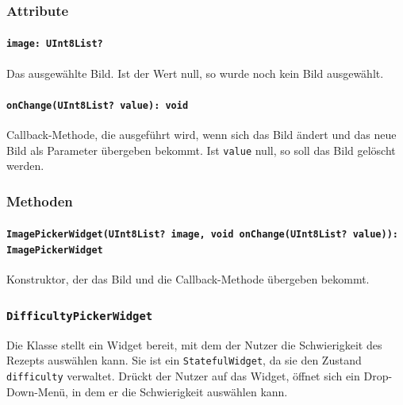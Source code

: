 \documentclass{entwurfsheft}
\begin{document}
\subsubsection*{Attribute}
\paragraph{\texttt{image: UInt8List?}}
Das ausgewählte Bild. Ist der Wert null, so wurde noch kein Bild ausgewählt.
\paragraph{\texttt{onChange(UInt8List? value): void}}
Callback-Methode, die ausgeführt wird, wenn sich das Bild ändert und das neue Bild als Parameter übergeben bekommt. Ist \texttt{value} null, so soll das Bild gelöscht werden.
\subsubsection*{Methoden}
\paragraph{\texttt{ImagePickerWidget(UInt8List? image, void onChange(UInt8List? value)): ImagePickerWidget}}
Konstruktor, der das Bild und die Callback-Methode übergeben bekommt.
\newpage

\subsubsection{\texttt{DifficultyPickerWidget}}
\label{sec:difficultyPickerWidget}
Die Klasse stellt ein Widget bereit, mit dem der Nutzer die Schwierigkeit des Rezepts auswählen kann. Sie ist ein \texttt{StatefulWidget}, da sie den Zustand \texttt{difficulty} verwaltet. Drückt der Nutzer auf das Widget, öffnet sich ein Drop-Down-Menü, in dem er die Schwierigkeit auswählen kann. 
\end{document}
